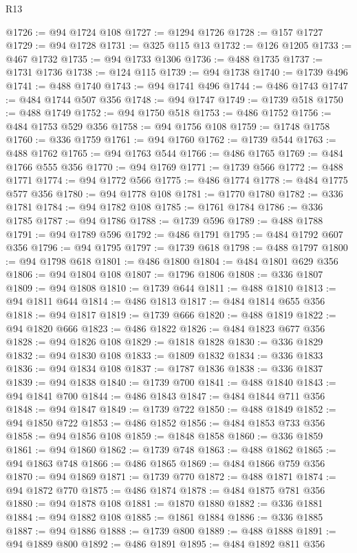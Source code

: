\begin{lexlean}{R13}
\begin{coremodule}
@1726 := @94 @1724 @108
@1727 := @1294 @1726
@1728 := @157 @1727
@1729 := @94 @1728
@1731 := @325 @115 @13
@1732 := @126 @1205
@1733 := @467 @1732
@1735 := @94 @1733 @1306
@1736 := @488 @1735
@1737 := @1731 @1736
@1738 := @124 @115
@1739 := @94 @1738
@1740 := @1739 @496
@1741 := @488 @1740
@1743 := @94 @1741 @496
@1744 := @486 @1743
@1747 := @484 @1744 @507 @356
@1748 := @94 @1747
@1749 := @1739 @518
@1750 := @488 @1749
@1752 := @94 @1750 @518
@1753 := @486 @1752
@1756 := @484 @1753 @529 @356
@1758 := @94 @1756 @108
@1759 := @1748 @1758
@1760 := @336 @1759
@1761 := @94 @1760
@1762 := @1739 @544
@1763 := @488 @1762
@1765 := @94 @1763 @544
@1766 := @486 @1765
@1769 := @484 @1766 @555 @356
@1770 := @94 @1769
@1771 := @1739 @566
@1772 := @488 @1771
@1774 := @94 @1772 @566
@1775 := @486 @1774
@1778 := @484 @1775 @577 @356
@1780 := @94 @1778 @108
@1781 := @1770 @1780
@1782 := @336 @1781
@1784 := @94 @1782 @108
@1785 := @1761 @1784
@1786 := @336 @1785
@1787 := @94 @1786
@1788 := @1739 @596
@1789 := @488 @1788
@1791 := @94 @1789 @596
@1792 := @486 @1791
@1795 := @484 @1792 @607 @356
@1796 := @94 @1795
@1797 := @1739 @618
@1798 := @488 @1797
@1800 := @94 @1798 @618
@1801 := @486 @1800
@1804 := @484 @1801 @629 @356
@1806 := @94 @1804 @108
@1807 := @1796 @1806
@1808 := @336 @1807
@1809 := @94 @1808
@1810 := @1739 @644
@1811 := @488 @1810
@1813 := @94 @1811 @644
@1814 := @486 @1813
@1817 := @484 @1814 @655 @356
@1818 := @94 @1817
@1819 := @1739 @666
@1820 := @488 @1819
@1822 := @94 @1820 @666
@1823 := @486 @1822
@1826 := @484 @1823 @677 @356
@1828 := @94 @1826 @108
@1829 := @1818 @1828
@1830 := @336 @1829
@1832 := @94 @1830 @108
@1833 := @1809 @1832
@1834 := @336 @1833
@1836 := @94 @1834 @108
@1837 := @1787 @1836
@1838 := @336 @1837
@1839 := @94 @1838
@1840 := @1739 @700
@1841 := @488 @1840
@1843 := @94 @1841 @700
@1844 := @486 @1843
@1847 := @484 @1844 @711 @356
@1848 := @94 @1847
@1849 := @1739 @722
@1850 := @488 @1849
@1852 := @94 @1850 @722
@1853 := @486 @1852
@1856 := @484 @1853 @733 @356
@1858 := @94 @1856 @108
@1859 := @1848 @1858
@1860 := @336 @1859
@1861 := @94 @1860
@1862 := @1739 @748
@1863 := @488 @1862
@1865 := @94 @1863 @748
@1866 := @486 @1865
@1869 := @484 @1866 @759 @356
@1870 := @94 @1869
@1871 := @1739 @770
@1872 := @488 @1871
@1874 := @94 @1872 @770
@1875 := @486 @1874
@1878 := @484 @1875 @781 @356
@1880 := @94 @1878 @108
@1881 := @1870 @1880
@1882 := @336 @1881
@1884 := @94 @1882 @108
@1885 := @1861 @1884
@1886 := @336 @1885
@1887 := @94 @1886
@1888 := @1739 @800
@1889 := @488 @1888
@1891 := @94 @1889 @800
@1892 := @486 @1891
@1895 := @484 @1892 @811 @356

\end{coremodule}
\end{lexlean}
